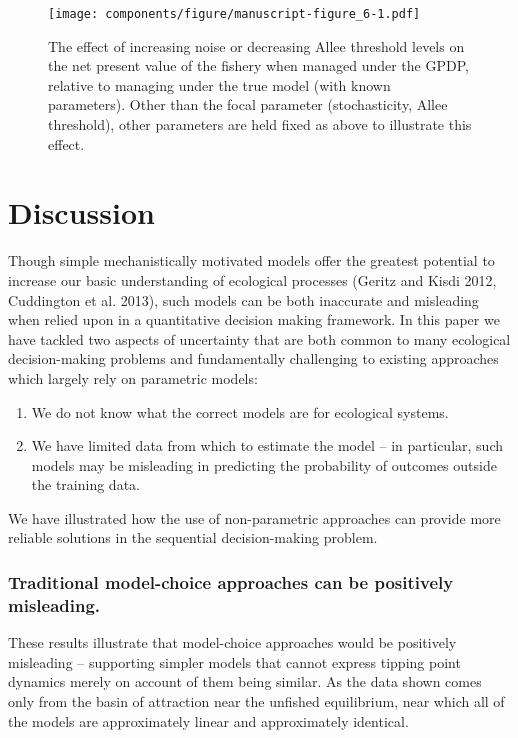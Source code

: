 \documentclass[author-year, 12pt,review]{components/elsarticle} %
\makeatletter
\def\maxwidth{\ifdim\Gin@nat@width>\linewidth\linewidth
\else\Gin@nat@width\fi}
\let\Oldincludegraphics\includegraphics
\renewcommand{\includegraphics}[1]{\Oldincludegraphics[width=\maxwidth]{#1}}
\makeatother
\begin{document}
\begin{figure}[htbp]
\centering
\texttt{[image: components/figure/manuscript-figure\_6-1.pdf]}
\caption{The effect of increasing noise or decreasing Allee threshold
levels on the net present value of the fishery when managed under the
GPDP, relative to managing under the true model (with known parameters).
Other than the focal parameter (stochasticity, Allee threshold), other
parameters are held fixed as above to illustrate this effect.}
\end{figure}

\section{Discussion}\label{discussion}

Though simple mechanistically motivated models offer the greatest
potential to increase our basic understanding of ecological processes
(Geritz and Kisdi 2012, Cuddington et al. 2013), such models can be both
inaccurate and misleading when relied upon in a quantitative decision
making framework. In this paper we have tackled two aspects of
uncertainty that are both common to many ecological decision-making
problems and fundamentally challenging to existing approaches which
largely rely on parametric models:

\begin{enumerate}
\def\labelenumi{\arabic{enumi}.}
\itemsep1pt\parskip0pt
\item
  We do not know what the correct models are for ecological systems.
\item
  We have limited data from which to estimate the model -- in
  particular, such models may be misleading in predicting the
  probability of outcomes outside the training data.
\end{enumerate}

We have illustrated how the use of non-parametric approaches can provide
more reliable solutions in the sequential decision-making problem.

\subsubsection{Traditional model-choice approaches can be positively
misleading.}\label{traditional-model-choice-approaches-can-be-positively-misleading.}

These results illustrate that model-choice approaches would be
positively misleading -- supporting simpler models that cannot express
tipping point dynamics merely on account of them being similar. As the
data shown comes only from the basin of attraction near the unfished
equilibrium, near which all of the models are approximately linear and
approximately identical.
\end{document}
